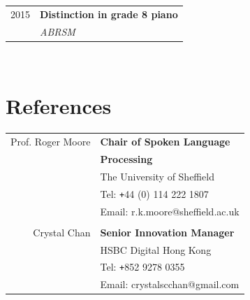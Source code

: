 \documentclass[10pt]{article} %
\begin{document}
\begin{changemargin}{0pt}{0.5pt}
\begin{minipage}[t]{0.44\textwidth}
\begin{tabular}{rl}
	
	2015	 & \textbf{Distinction in grade 8 piano}\\ & \textit{ABRSM}
\end{tabular}\\[10pt]



\section{References}

\begin{tabular}{rl}
	Prof. Roger Moore	 & \textbf{Chair of Spoken Language}\\ &\textbf{Processing}\\
	& The University of Sheffield\\ &Tel: \texttt{+}44 (0) 114 222 1807 \\ &Email: r.k.moore@sheffield.ac.uk \\ \\
	
	
	Crystal Chan	 & \textbf{Senior Innovation Manager}\\
	& HSBC Digital Hong Kong\\ & Tel: \texttt{+}852 9278 0355\\ & Email: crystalscchan@gmail.com
\end{tabular}\\[10pt]


\end{minipage} %

\end{changemargin}
\end{document}
